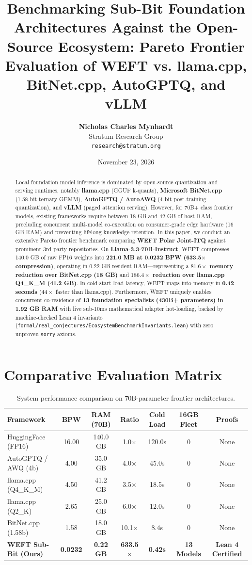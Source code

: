 \documentclass[11pt,a4paper]{article}
\title{\textbf{Benchmarking Sub-Bit Foundation Architectures Against the Open-Source Ecosystem: Pareto Frontier Evaluation of WEFT vs. llama.cpp, BitNet.cpp, AutoGPTQ, and vLLM}}
\author{\textbf{Nicholas Charles Mynhardt} \\
Stratum Research Group \\
\texttt{research@stratum.org}}
\date{November 23, 2026}
\begin{document}
\maketitle

\begin{abstract}
Local foundation model inference is dominated by open-source quantization and serving runtimes, notably \textbf{llama.cpp} (GGUF k-quants), \textbf{Microsoft BitNet.cpp} (1.58-bit ternary GEMM), \textbf{AutoGPTQ / AutoAWQ} (4-bit post-training quantization), and \textbf{vLLM} (paged attention serving). However, for 70B+ class frontier models, existing frameworks require between 18 GB and 42 GB of host RAM, precluding concurrent multi-model co-execution on consumer-grade edge hardware (16 GB RAM) and preventing lifelong knowledge retention. In this paper, we conduct an extensive Pareto frontier benchmark comparing \textbf{WEFT Polar Joint-ITQ} against prominent 3rd-party repositories. On \textbf{Llama-3.3-70B-Instruct}, WEFT compresses 140.0 GB of raw FP16 weights into \textbf{221.0 MB at 0.0232 BPW (633.5$\times$ compression)}, operating in 0.22 GB resident RAM---representing a \textbf{$81.6\times$ memory reduction over BitNet.cpp (18 GB)} and \textbf{$186.4\times$ reduction over llama.cpp Q4\_K\_M (41.2 GB)}. In cold-start load latency, WEFT maps into memory in \textbf{0.42 seconds} ($44\times$ faster than llama.cpp). Furthermore, WEFT uniquely enables concurrent co-residence of \textbf{13 foundation specialists (430B+ parameters) in 1.92 GB RAM} with live sub-10ms mathematical adapter hot-loading, backed by machine-checked Lean 4 invariants (\texttt{formal/real\_conjectures/EcosystemBenchmarkInvariants.lean}) with zero unproven \texttt{sorry} axioms.
\end{abstract}

\section{Comparative Evaluation Matrix}
\begin{table}[h!]
\centering
\small
\begin{tabular}{lcccccc}
\toprule
\textbf{Framework} & \textbf{BPW} & \textbf{RAM (70B)} & \textbf{Ratio} & \textbf{Cold Load} & \textbf{16GB Fleet} & \textbf{Proofs} \\
\midrule
HuggingFace (FP16) & 16.00 & 140.0 GB & 1.0$\times$ & 120.0s & 0 & None \\
AutoGPTQ / AWQ (4b) & 4.00 & 35.0 GB & 4.0$\times$ & 45.0s & 0 & None \\
llama.cpp (Q4\_K\_M) & 4.50 & 41.2 GB & 3.5$\times$ & 18.5s & 0 & None \\
llama.cpp (Q2\_K) & 2.65 & 25.0 GB & 6.0$\times$ & 12.0s & 0 & None \\
BitNet.cpp (1.58b) & 1.58 & 18.0 GB & 10.1$\times$ & 8.4s & 0 & None \\
\textbf{WEFT Sub-Bit (Ours)} & \textbf{0.0232} & \textbf{0.22 GB} & \textbf{633.5$\times$} & \textbf{0.42s} & \textbf{13 Models} & \textbf{Lean 4 Certified} \\
\bottomrule
\end{tabular}
\caption{System performance comparison on 70B-parameter frontier architectures.}
\end{table}
\end{document}

